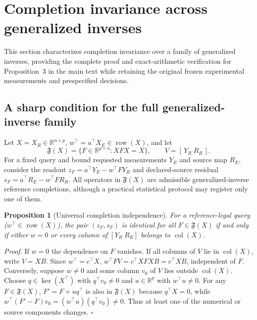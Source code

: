 \documentclass[11pt]{article}
\newtheorem{proposition}{Proposition}
\begin{document}


\par
\section{Completion invariance across generalized inverses}
\label{sec:operator-robustness}
This section characterizes completion invariance over a family of generalized inverses, providing the complete proof and exact-arithmetic verification for Proposition~3 in the main text while retaining the original frozen experimental measurements and prespecified decisions.

\subsection{A sharp condition for the full generalized-inverse family}
Let $X=X_R\in\mathbb R^{n\times p}$, $w^\top=a^\top X_E\in\operatorname{row}(X)$, and let
\[
\mathfrak F(X)=\{F\in\mathbb R^{p\times n}: XFX=X\},\qquad V=[\,Y_R\ R_R\,].
\]
For a fixed query and bound requested measurements $Y_E$ and source map $R_E$, consider the readout $z_F=a^\top Y_E-w^\top FY_R$ and declared-source residual $s_F=a^\top R_E-w^\top FR_R$. All operators in $\mathfrak F(X)$ are admissible generalized-inverse reference completions, although a practical statistical protocol may register only one of them.
\begin{proposition}[Universal completion independence]
\label{prop:universalcompletion}
For a reference-legal query ($w^\top\in\operatorname{row}(X)$), the pair $(z_F,s_F)$ is identical for all $F\in\mathfrak F(X)$ if and only if either $w=0$ or every column of $[Y_R\ R_R]$ belongs to $\operatorname{col}(X)$.
\end{proposition}
\noindent\emph{Proof.} If $w=0$ the dependence on $F$ vanishes. If all columns of $V$ lie in $\operatorname{col}(X)$, write $V=XB$. Since $w^\top=c^\top X$, $w^\top FV=c^\top XFXB=c^\top XB$, independent of $F$. Conversely, suppose $w\ne0$ and some column $v_0$ of $V$ lies outside $\operatorname{col}(X)$. Choose $q\in\ker(X^\top)$ with $q^\top v_0\ne0$ and $u\in\mathbb R^p$ with $w^\top u\ne0$. For any $F\in\mathfrak F(X)$, $F'=F+u q^\top$ is also in $\mathfrak F(X)$ because $q^\top X=0$, while $w^\top(F'-F)v_0=(w^\top u)(q^\top v_0)\ne0$. Thus at least one of the numerical or source components changes. $\square$
\end{document}
